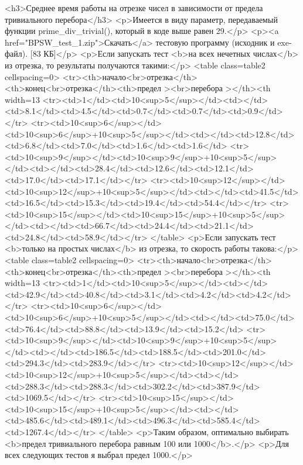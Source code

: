 <h3>Среднее время работы на отрезке чисел в зависимости от предела тривиального перебора</h3>
<p>Имеется в виду параметр, передаваемый функции prime_div_trivial(), который в коде выше равен 29.</p>
<p><a href="BPSW_test_1.zip">Скачать</a> тестовую программу (исходник и exe-файл). [83 КБ]</p>
<p>Если запускать тест <b>на всех нечетных числах</b> из отрезка, то результаты получаются такими:</p>
<table class=table2 cellspacing=0>
<tr><th>начало<br>отрезка</th><th>конец<br>отрезка</th><th>предел ><br>перебора ></th><th width=13%
<tr><td>1</td><td>10<sup>5</sup></td><td></td><td>8.1</td><td>4.5</td><td>0.7</td><td>0.7</td><td>0.9</td></tr>
<tr><td>10<sup>6</sup></td><td>10<sup>6</sup>+10<sup>5</sup></td><td></td><td>12.8</td><td>6.8</td><td>7.0</td><td>1.6</td><td>1.6</td>
<tr><td>10<sup>9</sup></td><td>10<sup>9</sup>+10<sup>5</sup></td><td></td><td>28.4</td><td>12.6</td><td>12.1</td><td>17.0</td><td>17.1</td></tr>
<tr><td>10<sup>12</sup></td><td>10<sup>12</sup>+10<sup>5</sup></td><td></td><td>41.5</td><td>16.5</td><td>15.3</td><td>19.4</td><td>54.4</td></tr>
<tr><td>10<sup>15</sup></td><td>10<sup>15</sup>+10<sup>5</sup></td><td></td><td>66.7</td><td>24.4</td><td>21.1</td><td>24.8</td><td>58.9</td></tr>
</table>
<p>Если запускать тест <b>только на простых числах</b> из отрезка, то скорость работы такова:</p>
<table class=table2 cellspacing=0>
<tr><th>начало<br>отрезка</th><th>конец<br>отрезка</th><th>предел ><br>перебора ></th><th width=13%
<tr><td>1</td><td>10<sup>5</sup></td><td></td><td>42.9</td><td>40.8</td><td>3.1</td><td>4.2</td><td>4.2</td></tr>
<tr><td>10<sup>6</sup></td><td>10<sup>6</sup>+10<sup>5</sup></td><td></td><td>75.0</td><td>76.4</td><td>88.8</td><td>13.9</td><td>15.2</td>
<tr><td>10<sup>9</sup></td><td>10<sup>9</sup>+10<sup>5</sup></td><td></td><td>186.5</td><td>188.5</td><td>201.0</td><td>294.3</td><td>283.9</td></tr>
<tr><td>10<sup>12</sup></td><td>10<sup>12</sup>+10<sup>5</sup></td><td></td><td>288.3</td><td>288.3</td><td>302.2</td><td>387.9</td><td>1069.5</td></tr>
<tr><td>10<sup>15</sup></td><td>10<sup>15</sup>+10<sup>5</sup></td><td></td><td>485.6</td><td>489.1</td><td>496.3</td><td>585.4</td><td>1267.4</td></tr>
</table>
<p>Таким образом, оптимально выбирать <b>предел тривиального перебора равным 100 или 1000</b>.</p>
<p>Для всех следующих тестов я выбрал предел 1000.</p>

